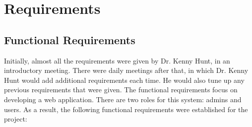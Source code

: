 \section{Requirements}
\label{sec:Requirements}

\subsection{Functional Requirements}
Initially, almost all the requirements were given by Dr. Kenny Hunt, in an introductory meeting. There were daily meetings after that, in which Dr. Kenny Hunt would add additional requirements each time. He would also tune up any previous requirements that were given. The functional requirements focus on developing a web application. There are two roles for this system: admins and users. As a result, the following functional requirements were established for the project:
